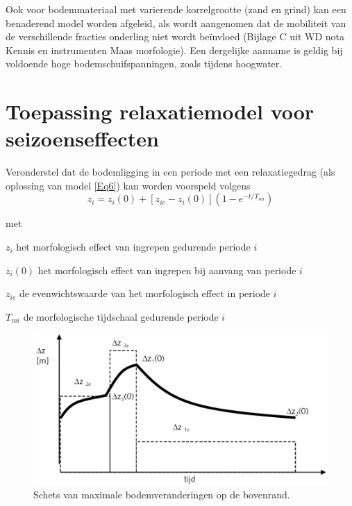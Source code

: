 Ook voor bodemmateriaal met varierende korrelgrootte (zand en grind) kan een benaderend model worden afgeleid, als wordt aangenomen dat de mobiliteit van de verschillende fracties onderling niet wordt be\"invloed (Bijlage C uit WD nota Kennis en instrumenten Maas morfologie).
Een dergelijke aanname is geldig bij voldoende hoge bodemschuifspanningen, zoals tijdens hoogwater.

\section{Toepassing relaxatiemodel voor seizoenseffecten}

Veronderstel dat de bodemligging in een periode met een relaxatiegedrag (als oplossing van model \autoref{Eq6}) kan worden voorspeld volgens
%
\begin{equation}
z_i = z_i (0) + [z_{ie} - z_i(0)](1 - e^{-t/T_{mi}})
\label{Eq7}
\end{equation}

met

\begin{symbollist}
\item[$z_i$]  het morfologisch effect van ingrepen gedurende periode $i$
\item[$z_i(0)$]  het morfologisch effect van ingrepen bij aanvang van periode $i$
\item[$z_{ie}$]  de evenwichtswaarde van het morfologisch effect in periode $i$
\item[$T_{mi}$]  de morfologische tijdschaal gedurende periode $i$
\end{symbollist}

\begin{figure}
\includegraphics[width=\columnwidth]{figures/Fig5.png}
\caption{Schets van maximale bodemveranderingen op de bovenrand.}
\label{Fig5}
\end{figure}

